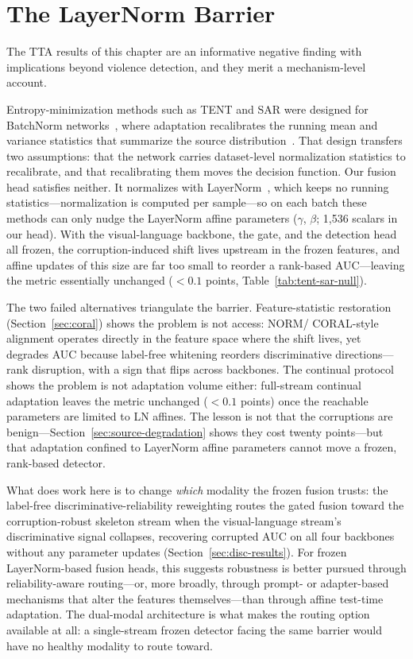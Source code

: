 \section{The LayerNorm Barrier}
\label{sec:ln-barrier}

The TTA results of this chapter are an informative negative finding with
implications beyond violence detection, and they merit a mechanism-level
account.

Entropy-minimization methods such as TENT and SAR were designed for BatchNorm
networks~\cite{ioffe2015batchnorm}, where adaptation recalibrates the running
mean and variance statistics that summarize the source
distribution~\cite{wang2021tent}. That design transfers two assumptions:
that the network carries dataset-level normalization statistics to
recalibrate, and that recalibrating them moves the decision function. Our
fusion head satisfies neither. It normalizes with
LayerNorm~\cite{ba2016layernorm}, which keeps no running
statistics---normalization is computed per sample---so on each batch these
methods can only nudge the LayerNorm affine parameters ($\gamma$, $\beta$;
1{,}536 scalars in our head). With the visual-language backbone, the gate,
and the detection head all frozen, the corruption-induced shift lives
upstream in the frozen features, and affine updates of this size are far too
small to reorder a rank-based AUC---leaving the metric essentially unchanged
($<0.1$ points, Table~\ref{tab:tent-sar-null}).

The two failed alternatives triangulate the barrier. Feature-statistic
restoration (Section~\ref{sec:coral}) shows the problem is not access: NORM/
CORAL-style alignment operates directly in the feature space where the shift
lives, yet degrades AUC because label-free whitening reorders discriminative
directions---rank disruption, with a sign that flips across backbones. The
continual protocol shows the problem is not adaptation volume
either: full-stream continual adaptation leaves the metric unchanged
($<0.1$ points) once the reachable parameters are limited to LN affines. The lesson
is not that the corruptions are benign---Section~\ref{sec:source-degradation}
shows they cost twenty points---but that adaptation confined to LayerNorm
affine parameters cannot move a frozen, rank-based detector.

What does work here is to change \emph{which} modality the frozen fusion
trusts: the label-free discriminative-reliability reweighting routes the
gated fusion toward the corruption-robust skeleton stream when the
visual-language stream's discriminative signal collapses, recovering
corrupted AUC on all four backbones without any parameter updates
(Section~\ref{sec:disc-results}). For frozen LayerNorm-based fusion heads,
this suggests robustness is better pursued through reliability-aware
routing---or, more broadly, through prompt- or adapter-based mechanisms that
alter the features themselves---than through affine test-time adaptation.
The dual-modal architecture is what makes the routing option available at
all: a single-stream frozen detector facing the same barrier would have no
healthy modality to route toward.
